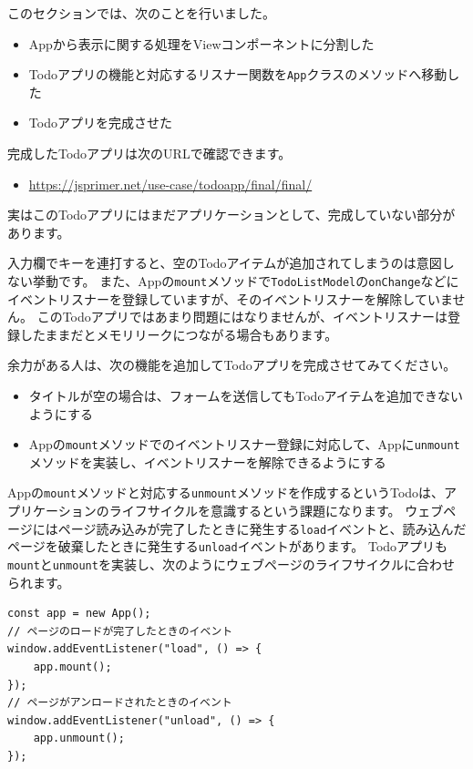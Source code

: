 このセクションでは、次のことを行いました。

\begin{itemize}
\item
  Appから表示に関する処理をViewコンポーネントに分割した
\item
  Todoアプリの機能と対応するリスナー関数を\texttt{App}クラスのメソッドへ移動した
\item
  Todoアプリを完成させた
\end{itemize}

完成したTodoアプリは次のURLで確認できます。

\begin{itemize}
\item
  \url{https://jsprimer.net/use-case/todoapp/final/final/}
\end{itemize}

実はこのTodoアプリにはまだアプリケーションとして、完成していない部分があります。

入力欄でキーを連打すると、空のTodoアイテムが追加されてしまうのは意図しない挙動です。
また、Appの\texttt{mount}メソッドで\texttt{TodoListModel}の\texttt{onChange}などにイベントリスナーを登録していますが、そのイベントリスナーを解除していません。
このTodoアプリではあまり問題にはなりませんが、イベントリスナーは登録したままだとメモリリークにつながる場合もあります。

余力がある人は、次の機能を追加してTodoアプリを完成させてみてください。

\begin{itemize}
\item
  タイトルが空の場合は、フォームを送信してもTodoアイテムを追加できないようにする
\item
  Appの\texttt{mount}メソッドでのイベントリスナー登録に対応して、Appに\texttt{unmount}メソッドを実装し、イベントリスナーを解除できるようにする
\end{itemize}

Appの\texttt{mount}メソッドと対応する\texttt{unmount}メソッドを作成するというTodoは、アプリケーションのライフサイクルを意識するという課題になります。
ウェブページにはページ読み込みが完了したときに発生する\texttt{load}イベントと、読み込んだページを破棄したときに発生する\texttt{unload}イベントがあります。
Todoアプリも\texttt{mount}と\texttt{unmount}を実装し、次のようにウェブページのライフサイクルに合わせられます。

\begin{lstlisting}
const app = new App();
// ページのロードが完了したときのイベント
window.addEventListener("load", () => {
    app.mount();
});
// ページがアンロードされたときのイベント
window.addEventListener("unload", () => {
    app.unmount();
});
\end{lstlisting}

